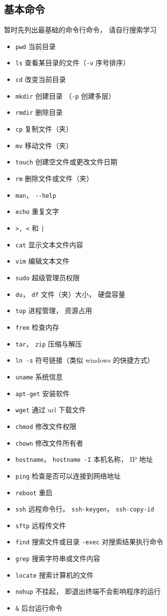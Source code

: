 \subsection{基本命令}
暂时先列出最基础的命令行命令， 请自行搜索学习
\begin{itemize}
\item \verb|pwd| 当前目录
\item \verb|ls| 查看某目录的文件（\verb|-v| 序号排序）
\item \verb|cd| 改变当前目录
\item \verb|mkdir| 创建目录 （\verb|-p| 创建多层）
\item \verb|rmdir| 删除目录
\item \verb|cp| 复制文件（夹）
\item \verb|mv| 移动文件（夹）
\item \verb|touch| 创建空文件或更改文件日期
\item \verb|rm| 删除文件或文件（夹）
\item \verb|man|， \verb|--help|
\item \verb|echo| 重复文字
\item \verb|>, <| 和 \verb`|`
\item \verb|cat| 显示文本文件内容
\item \verb|vim| 编辑文本文件
\item \verb|sudo| 超级管理员权限
\item \verb|du|， \verb|df| 文件（夹）大小， 硬盘容量
\item \verb|top| 进程管理， 资源占用
\item \verb|free| 检查内存
\item \verb|tar|， \verb|zip| 压缩与解压
\item \verb|ln -s| 符号链接（类似 windows 的快捷方式）
\item \verb|uname| 系统信息
\item \verb|apt-get| 安装软件
\item \verb|wget| 通过 url 下载文件
\item \verb|chmod| 修改文件权限
\item \verb|chown| 修改文件所有者
\item \verb|hostname|， \verb|hostname -I| 本机名称， IP 地址
\item \verb|ping| 检查是否可以连接到网络地址
\item \verb|reboot| 重启
\item \verb|ssh| 远程命令行。 \verb|ssh-keygen|， \verb|ssh-copy-id|
\item \verb|sftp| 远程传文件
\item \verb|find| 搜索文件或目录 \verb|-exec| 对搜索结果执行命令
\item \verb|grep| 搜索字符串或文件内容
\item \verb|locate| 搜索计算机的文件
\item \verb|nohup| 不挂起， 即退出终端不会影响程序的运行
\item \verb|&| 后台运行命令
\end{itemize}

